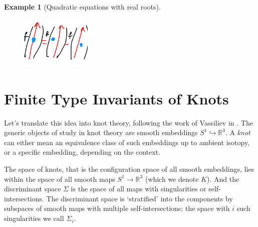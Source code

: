 \documentclass[12pt]{report}
\newcommand{\R}{\mathbb{R}}
\theoremstyle{regular}
\newtheorem{example}{Example}
\begin{document}
\begin{example}[Quadratic equations with real roots]
        \begin{figure}[H]
                \centering
                \includegraphics[width=0.3\textwidth]{graphics/simple_singularity_relation.jpg}
        \end{figure}
        \end{example}



        \section*{Finite Type Invariants of Knots}

        Let's translate this idea into knot theory, following the work of Vassiliev in \cite{cohomology-of-knot-spaces, complements-of-discriminants-of-smooth-maps-topology-and-applications}. The generic objects of study in knot theory are smooth embeddings \(S^{1} \hookrightarrow \R^{3}\). A \textit{knot} can either mean an equivalence class of such embeddings up to ambient isotopy, or a specific embedding, depending on the context.

        The space of knots, that is the configuration space of all smooth embeddings, lies within the space of all smooth maps \(S^{1} \to \R^{3}\) (which we denote \(K\)). And the discriminant space \(\Sigma\) is the space of all maps with singularities or self-intersections. The discriminant space is `stratified' into the components by subspaces of smooth maps with multiple self-intersections; the space with \(i\) such singularities we call \(\Sigma_{i}\).
\end{document}
